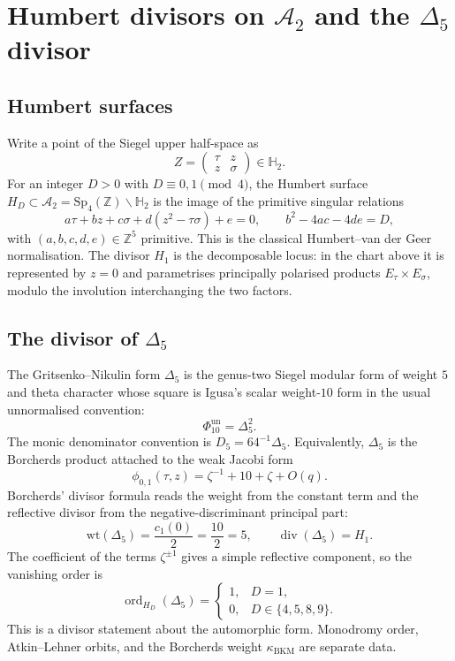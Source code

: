 \providecommand{\Amoduli}{\mathcal{A}_2}
\providecommand{\Hd}{H_D}
\providecommand{\Hone}{H_1}
\providecommand{\kBKM}{\kappa_{\mathrm{BKM}}}
\providecommand{\kcat}{\kappa_{\mathrm{cat}}}
\providecommand{\kch}{\kappa_{\mathrm{ch}}}
\providecommand{\kfiber}{\kappa_{\mathrm{fiber}}}
\providecommand{\DeltaFive}{\Delta_5}
\providecommand{\Dfive}{D_5}
\providecommand{\Hsieg}{\mathbb{H}_2}
\providecommand{\Spfour}{\mathrm{Sp}_4(\mathbb{Z})}

\section*{Humbert divisors on $\Amoduli$ and the $\DeltaFive$ divisor}

\subsection*{Humbert surfaces}
Write a point of the Siegel upper half-space as
\[
  Z=\begin{pmatrix}\tau & z\\ z & \sigma\end{pmatrix}\in\Hsieg .
\]
For an integer $D>0$ with $D\equiv 0,1\pmod 4$, the Humbert surface
$H_D\subset\Amoduli=\Spfour\backslash\Hsieg$ is the image of the
primitive singular relations
\[
  a\tau+bz+c\sigma+d(z^2-\tau\sigma)+e=0,\qquad
  b^2-4ac-4de=D,
\]
with $(a,b,c,d,e)\in\mathbb Z^5$ primitive.  This is the classical
Humbert--van der Geer normalisation.  The divisor $H_1$ is the
decomposable locus: in the chart above it is represented by $z=0$ and
parametrises principally polarised products $E_\tau\times E_\sigma$,
modulo the involution interchanging the two factors.

\subsection*{The divisor of $\DeltaFive$}
The Gritsenko--Nikulin form $\DeltaFive$ is the genus-two Siegel modular
form of weight $5$ and theta character whose square is Igusa's scalar
weight-$10$ form in the usual unnormalised convention:
\[
  \Phi_{10}^{\mathrm{un}}=\DeltaFive^2 .
\]
The monic denominator convention is \(\Dfive=64^{-1}\DeltaFive\).
Equivalently, $\DeltaFive$ is the Borcherds product attached to the
weak Jacobi form
\[
  \phi_{0,1}(\tau,z)=\zeta^{-1}+10+\zeta+O(q).
\]
Borcherds' divisor formula reads the weight from the constant term and
the reflective divisor from the negative-discriminant principal part:
\[
  \mathrm{wt}(\DeltaFive)=\frac{c_1(0)}2=\frac{10}{2}=5,\qquad
  \operatorname{div}(\DeltaFive)=H_1 .
\]
The coefficient of the terms $\zeta^{\pm1}$ gives a simple reflective
component, so the vanishing order is
\[
  \operatorname{ord}_{H_D}(\DeltaFive)=
  \begin{cases}
    1,&D=1,\\
    0,&D\in\{4,5,8,9\}.
  \end{cases}
\]
This is a divisor statement about the automorphic form.  Monodromy
order, Atkin--Lehner orbits, and the Borcherds weight $\kBKM$ are
separate data.

